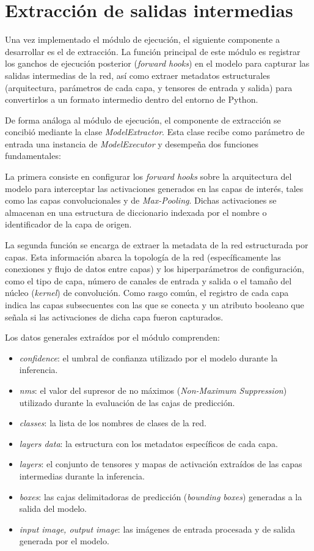 \section{Extracción de salidas intermedias}
Una vez implementado el módulo de ejecución, el siguiente componente a desarrollar es el de 
extracción. La función principal de este módulo es registrar los ganchos de ejecución posterior 
(\textit{forward hooks}) en el modelo para capturar las salidas intermedias de la red, así como 
extraer metadatos estructurales (arquitectura, parámetros de cada capa, y tensores de entrada y 
salida) para convertirlos a un formato intermedio dentro del entorno de Python.
\medskip

De forma análoga al módulo de ejecución, el componente de extracción se concibió mediante la clase 
\textit{ModelExtractor}. Esta clase recibe como parámetro de entrada una instancia de 
\textit{ModelExecutor} y desempeña dos funciones fundamentales:
\medskip

La primera consiste en configurar los \textit{forward hooks} sobre la arquitectura del modelo 
para interceptar las activaciones generados en las capas de interés, tales como las capas 
convolucionales y de \textit{Max-Pooling}. Dichas activaciones se almacenan 
en una estructura de diccionario indexada por el nombre o identificador de la capa de origen.
\medskip

La segunda función se encarga de extraer la metadata de la red estructurada por capas. Esta 
información abarca la topología de la red (específicamente las conexiones y flujo de datos entre 
capas) y los hiperparámetros de configuración, como el tipo de capa, número de canales de 
entrada y salida o el tamaño del núcleo (\textit{kernel}) de convolución. Como rasgo común, 
el registro de cada capa indica las capas subsecuentes con las que se conecta y un atributo 
booleano que señala si las activaciones de dicha capa fueron capturados.
\medskip

Los datos generales extraídos por el módulo comprenden:
\begin{itemize}
    \item \textit{confidence}: el umbral de confianza utilizado por el modelo durante la inferencia.
    \item \textit{nms}: el valor del supresor de no máximos (\textit{Non-Maximum Suppression})
    utilizado durante la evaluación de las cajas de predicción.
    \item \textit{classes}: la lista de los nombres de clases de la red.
    \item \textit{layers data}: la estructura con los metadatos específicos de cada capa.
    \item \textit{layers}: el conjunto de tensores y mapas de activación extraídos de las capas intermedias durante 
    la inferencia.
    \item \textit{boxes}: las cajas delimitadoras de predicción (\textit{bounding boxes}) generadas 
    a la salida del modelo.
    \item \textit{input image, output image}: las imágenes de entrada procesada y de salida 
    generada por el modelo.
\end{itemize}

